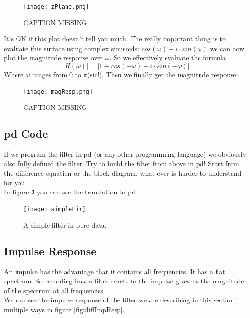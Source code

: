 {\begin{figure}[H]
	\centering
	\texttt{[image: zPlane.png]}
	\caption[shortCaption]
	{CAPTION MISSING}
	\label{fig:label}
\end{figure}

It's OK if this plot doesn't tell you much. The really important thing is to evaluate this surface using complex sinusoids: 
$cos(\omega) + i\cdot sin(\omega)$ we can now plot the magnitude response over $\omega$. So we effectively evaluate the formula
\begin{equation}
	|H(\omega)| = |1 + cos(-\omega)+i \cdot sin(-\omega)|
\end{equation}
Where $\omega$ ranges from $0$ to $\pi$(sic!). Then we finally get the magnitude response:

\begin{figure}[H]
	\centering
	\texttt{[image: magResp.png]}
	\caption[shortCaption]
	{CAPTION MISSING}
	\label{fig:label}
\end{figure}



}

\subsection{pd Code} %
\label{sub:pd_code}
If we program the filter in pd (or any other programming language) we obviously also fully defined the filter. Try to build the filter from above in pd! Start from the difference equation or the block diagram, what ever is harder to understand for you.\\
In figure \ref{fig:pdSimpleFir} you can see the translation to pd.

\begin{figure}[H]
	\centering
	\texttt{[image: simpleFir]}
	\caption[FIR filter in pd]
	{A simple filter in pure data.}
	\label{fig:pdSimpleFir}
\end{figure}




\subsection{Impulse Response}

An impulse has the advantage that it contains all frequencies. It has a flat spectrum.  So recording how a filter reacts to the impulse gives us the magnitude of the spectrum at all frequencies.\\
We can see the impulse response of the filter we are describing in this section in  multiple ways in figure \ref{fig:diffImpResp}.

